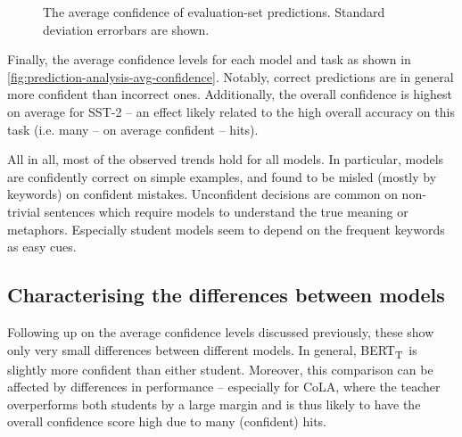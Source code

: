 \documentclass[bsc,frontabs,singlespacing,parskip,deptreport]{infthesis}
\def\BERTT{BERT\textsubscript{T}}
\begin{document}
{{{      \begin{figure}[h!tb]
        \centering
        \caption{The average confidence of evaluation-set predictions. Standard deviation errorbars are shown.}
        \label{fig:prediction-analysis-avg-confidence}
      \end{figure}
      Finally, the average confidence levels for each model and task as shown in \autoref{fig:prediction-analysis-avg-confidence}. Notably, correct predictions are in general more confident than incorrect ones. Additionally, the overall confidence is highest on average for SST-2 -- an effect likely related to the high overall accuracy on this task (i.e. many -- on average confident -- hits).

      All in all, most of the observed trends hold for all models. In particular, models are confidently correct on simple examples, and found to be misled (mostly by keywords) on confident mistakes. Unconfident decisions are common on non-trivial sentences which require models to understand the true meaning or metaphors. Especially student models seem to depend on the frequent keywords as easy cues.
    }
    
    \subsection{Characterising the differences between models}{
      Following up on the average confidence levels discussed previously, these show only very small differences between different models. In general, \BERTT~is slightly more confident than either student. Moreover, this comparison can be affected by differences in performance -- especially for CoLA, where the teacher overperforms both students by a large margin and is thus likely to have the overall confidence score high due to many (confident) hits.

}}}
\end{document}
